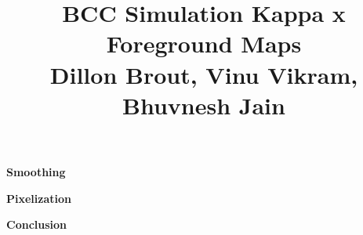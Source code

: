 \documentclass[12pt,preprint]{aastex}
\begin{document}
\title{BCC Simulation Kappa x Foreground Maps \\ \small Dillon Brout, Vinu Vikram, Bhuvnesh Jain }

\textbf{Smoothing}

\textbf{Pixelization}


\begin{comment}
\begin{figure}
\centering
\epsscale{.5}  %
\plotone{abc.pdf}
\caption{}
\label{fig:abc}
\end{figure}
\end{comment}


   



\textbf{Conclusion}
\end{document}
